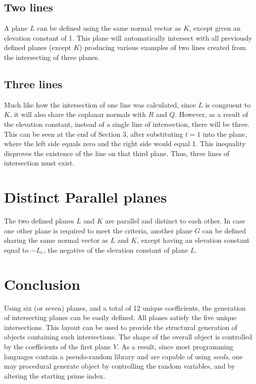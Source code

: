 \documentclass[a4paper, 12pt]{article}
\begin{document}
\subsection{Two lines}
A plane $L$ can be defined using the same normal vector as $K$, except given an elevation constant of 1. This plane will automatically intersect with all previously defined planes (except $K$) producing various examples of two lines created from the intersecting of three planes.
\subsection{Three lines}
Much like how the intersection of one line was calculated, since $L$ is congruent to $K$, it will also share the coplanar normals with $R$ and $Q$. However, as a result of the elevation constant, instead of a single line of intersection, there will be three. This can be seen at the end of Section 3, after substituting $t=1$ into the plane, where the left side equals zero and the right side would equal 1. This inequality disproves the existence of the line on that third plane. Thus, three lines of intersection must exist.
\section{Distinct Parallel planes}
The two defined planes $L$ and $K$ are parallel and distinct to each other. In case one other plane is required to meet the criteria, another plane $G$ can be defined sharing the same normal vector as $L$ and $K$, except having an elevation constant equal to $-L_e$, the negative of the elevation constant of plane $L$. 
\section{Conclusion}
Using six (or seven) planes, and a total of 12 unique coefficients, the generation of intersecting planes can be easily defined. All planes satisfy the five unique intersections. This layout can be used to provide the structural generation of objects containing such intersections. The shape of the overall object is controlled by the coefficients of the first plane $V$. As a result, since most programming languages contain a pseudo-random library and are capable of using \textit{seeds}, one may procedural generate object by controlling the random variables, and by altering the starting prime index.
\end{document}
